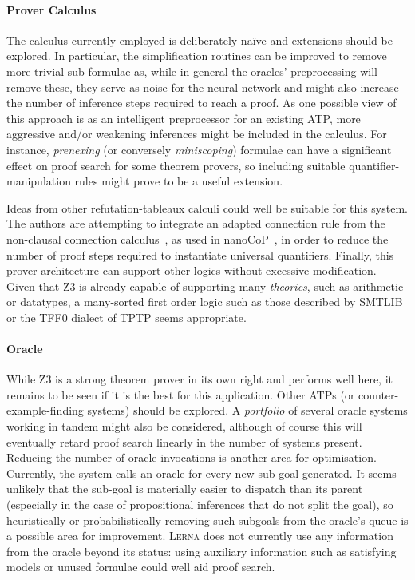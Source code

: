 \documentclass{llncs}
\newcommand{\lerna}{\textsc{Lerna}}
\newcommand{\z}[1]{\textsc{Z3}}
\begin{document}
\paragraph{Prover Calculus}
The calculus currently employed is deliberately na\"ive and extensions should be explored. 
In particular, the simplification routines can be improved to remove more trivial sub-formulae as, while in general the oracles' preprocessing will remove these, they serve as noise for the neural network and might also increase the number of inference steps required to reach a proof.
As one possible view of this approach is as an intelligent preprocessor for an existing ATP, more aggressive and/or weakening inferences might be included in the calculus.
For instance, \emph{prenexing} (or conversely \emph{miniscoping}) formulae can have a significant effect on proof search for some theorem provers, so including suitable quantifier-manipulation rules might prove to be a useful extension.

Ideas from other refutation-tableaux calculi could well be suitable for this system.
The authors are attempting to integrate an adapted connection rule from the non-clausal connection calculus~\cite{non-clausal-connections}, as used in nanoCoP~\cite{nanocop}, in order to reduce the number of proof steps required to instantiate universal quantifiers.
Finally, this prover architecture can support other logics without excessive modification.
Given that \z3 is already capable of supporting many \emph{theories}, such as arithmetic or datatypes, a many-sorted first order logic such as those described by SMTLIB or the TFF0 dialect of TPTP seems appropriate.

\paragraph{Oracle}
While \z3 is a strong theorem prover in its own right and performs well here, it remains to be seen if it is the best for this application.
Other ATPs (or counter-example-finding systems) should be explored. 
A \emph{portfolio} of several oracle systems working in tandem might also be considered, although of course this will eventually retard proof search linearly in the number of systems present.
Reducing the number of oracle invocations is another area for optimisation.
Currently, the system calls an oracle for every new sub-goal generated.
It seems unlikely that the sub-goal is materially easier to dispatch than its parent (especially in the case of propositional inferences that do not split the goal), so heuristically or probabilistically removing such subgoals from the oracle's queue is a possible area for improvement.
\lerna{} does not currently use any information from the oracle beyond its status: using auxiliary information such as satisfying models or unused formulae could well aid proof search.
\end{document}
